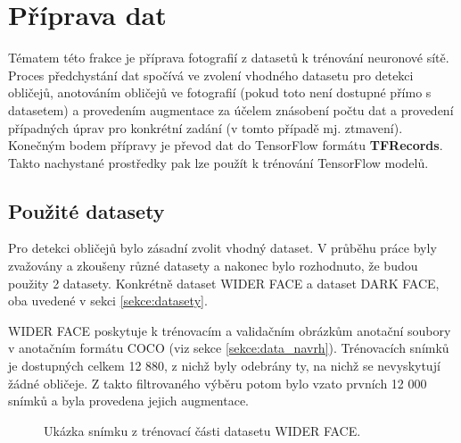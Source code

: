 \section{Příprava dat}
\label{sekce:priprava_dat}
Tématem této frakce je příprava fotografií z datasetů k trénování neuronové sítě. Proces předchystání dat spočívá ve zvolení vhodného datasetu pro detekci obličejů, anotováním obličejů ve fotografií (pokud toto není dostupné přímo s datasetem) a provedením augmentace za účelem znásobení počtu dat a provedení případných úprav pro konkrétní zadání (v tomto případě mj. ztmavení). Konečným bodem přípravy je převod dat do TensorFlow formátu \textbf{TFRecords}. Takto nachystané prostředky pak lze použít k trénování TensorFlow modelů.

\subsection*{Použité datasety}
Pro detekci obličejů bylo zásadní zvolit vhodný dataset. V průběhu práce byly zvažovány a zkoušeny různé datasety a nakonec bylo rozhodnuto, že budou použity 2 datasety. Konkrétně dataset WIDER FACE a dataset DARK FACE, oba uvedené v sekci \ref{sekce:datasety}.

WIDER FACE poskytuje k trénovacím a validačním obrázkům anotační soubory v anotačním formátu COCO (viz sekce \ref{sekce:data_navrh}). Trénovacích snímků je dostupných celkem 12 880, z nichž byly odebrány ty, na nichž se nevyskytují žádné obličeje. Z takto filtrovaného výběru potom bylo vzato prvních 12 000 snímků a byla provedena jejich augmentace.

\begin{figure}[H]
  \begin{center}
  \label{obrazek:widerfaceexample}
  \caption{Ukázka snímku z trénovací části datasetu WIDER FACE.}
  \end{center}
\end{figure}

